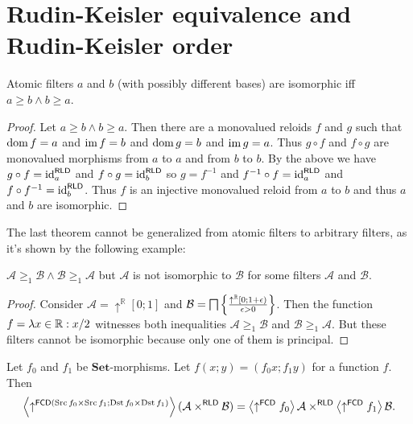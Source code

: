 \section{Rudin-Keisler equivalence and Rudin-Keisler order}
\begin{thm}
Atomic filters $a$ and $b$ (with possibly different bases) are isomorphic
iff $a\ge b\land b\ge a$.\end{thm}
\begin{proof}
Let $a\ge b\land b\ge a$. Then there are a monovalued reloids $f$
and $g$ such that $\operatorname{dom} f=a$ and $\operatorname{im} f=b$ and $\operatorname{dom} g=b$ and
$\operatorname{im} g=a$. Thus $g\circ f$ and $f\circ g$ are monovalued morphisms
from $a$ to $a$ and from $b$ to $b$. By the above we have $g\circ f=\operatorname{id}_{a}^{\mathsf{RLD}}$
and $f\circ g=\operatorname{id}_{b}^{\mathsf{RLD}}$ so $g=f^{-1}$ and $f^{-1}\circ f=\operatorname{id}_{a}^{\mathsf{RLD}}$
and $f\circ f^{-1}=\operatorname{id}_{b}^{\mathsf{RLD}}$. Thus $f$ is an injective
monovalued reloid from $a$ to $b$ and thus $a$ and $b$ are isomorphic.
\end{proof}
The last theorem cannot be generalized from atomic filters to arbitrary
filters, as it's shown by the following example:
\begin{example}
$\mathcal{A}\ge_{1}\mathcal{B}\wedge\mathcal{B}\ge_{1}\mathcal{A}$
but $\mathcal{A}$ is not isomorphic to $\mathcal{B}$ for some filters
$\mathcal{A}$ and $\mathcal{B}$.\end{example}
\begin{proof}
Consider $\mathcal{A}=\uparrow^{\mathbb{R}}[0;1]$ and $\mathcal{B}=\bigsqcap\left\{ \frac{\uparrow^{\mathbb{R}}[0;1+\epsilon)}{\epsilon>0}\right\}$.
Then the function $f=\lambda x\in\mathbb{R}:x/2$ witnesses both
inequalities $\mathcal{A}\ge_{1}\mathcal{B}$ and $\mathcal{B}\ge_{1}\mathcal{A}$.
But these filters cannot be isomorphic because only one of them is
principal.\end{proof}
\begin{lem}
Let $f_{0}$ and $f_{1}$ be $\mathbf{Set}$-morphisms. Let $f(x;y)=(f_{0}x;f_{1}y)$
for a function $f$. Then
\[
\left\langle \uparrow^{\mathsf{FCD}(\operatorname{Src} f_{0}\times\operatorname{Src} f_{1};\operatorname{Dst} f_{0}\times\operatorname{Dst} f_{1})}\right\rangle(\mathcal{A}\times^{\mathsf{RLD}}\mathcal{B})=\left\langle \uparrow^{\mathsf{FCD}}f_{0}\right\rangle\mathcal{A}\times^{\mathsf{RLD}}\left\langle \uparrow^{\mathsf{FCD}}f_{1}\right\rangle\mathcal{B}.
\]
\end{lem}
